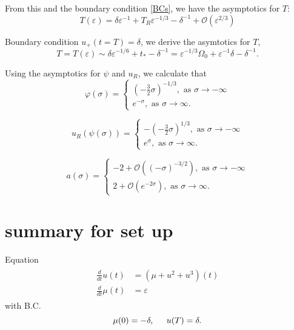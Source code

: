 \documentclass[letterpaper,11pt]{article}
\newcommand{\rmO}{\mathcal{O}}
\newcommand{\eps}{\varepsilon}
\numberwithin{equation}{section}
\theoremstyle{plain}
\begin{document}
From this and the boundary condition \eqref{BCs}, we have the asymptotics for $T$:
\begin{equation}
T (\eps)= \delta \eps^{-1} + T_R\eps^{-1/3} - \delta^{-1} + \rmO(\eps^{2/3})
\end{equation}


Boundary condition $u_+(t=T)=\delta$, we derive the asymtotics for $T$,
\[
T = T(\eps) \sim \delta\eps^{-1/6} + t_* -\delta^{-1} = \eps^{-1/3}\Omega_0 +\eps^{-1}\delta -\delta^{-1}.
\]


Using the asymptotics for $\psi$ and $u_R$, we calculate that
\begin{equation}
\varphi(\sigma) =\begin{cases}
 (-\frac{3}{2}\sigma)^{-1/3}, \text{ as }\sigma \to -\infty\\
e^{-\sigma} , \text{ as }\sigma \to \infty.
\end{cases}
\end{equation}

\begin{equation}
u_R(\psi(\sigma)) =\begin{cases}
 -(-\frac{3}{2}\sigma)^{1/3}, \text{ as }\sigma \to -\infty\\
e^{\sigma} , \text{ as }\sigma \to \infty.
\end{cases}
\end{equation}

\begin{equation}
a(\sigma) =\begin{cases}
-2+ \rmO((-\sigma)^{-3/2}), \text{ as }\sigma \to -\infty\\
2+ \rmO(e^{-2\sigma}), \text{ as }\sigma \to \infty.
\end{cases}
\end{equation}



\pagebreak

\section{summary for set up}
Equation
\begin{align}
\begin{split}
\frac{d}{dt}u(t) &= (\mu+u^2+u^3)(t) \\
\frac{d}{dt}\mu (t)&=  \eps 
\end{split}
\end{align}
with B.C.
\begin{equation}
\mu(0) = -\delta, \hspace{0.2in} u(T) = \delta.
\end{equation}
\end{document}
